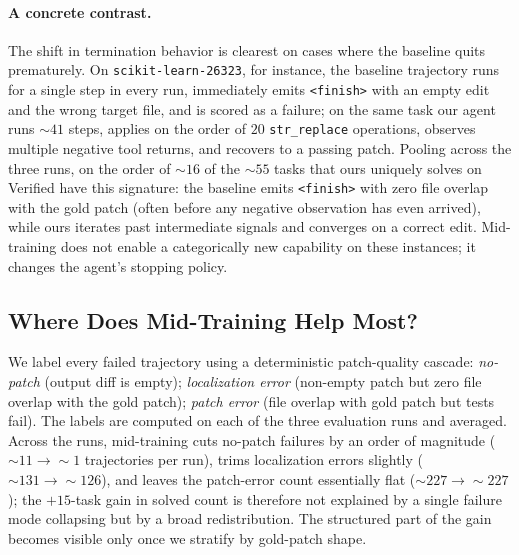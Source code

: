 \paragraph{A concrete contrast.}
The shift in termination behavior is clearest on cases where the baseline
quits prematurely. On \texttt{scikit-learn-26323}, for instance, the baseline
trajectory runs for a single step in every run, immediately emits
\texttt{<finish>} with an empty edit and the wrong target file, and is
scored as a failure; on the same task our agent runs $\sim\!41$ steps,
applies on the order of $20$ \texttt{str\_replace} operations, observes
multiple negative tool returns, and recovers to a passing patch. Pooling
across the three runs, on the order of $\sim\!16$ of the $\sim\!55$ tasks
that ours uniquely solves on Verified have this signature: the baseline
emits \texttt{<finish>} with zero file overlap with the gold patch (often
before any negative observation has even arrived), while ours iterates past
intermediate signals and converges on a correct edit. Mid-training does not
enable a categorically new capability on these instances; it changes the
agent's stopping policy.


\subsection{Where Does Mid-Training Help Most?}
\label{sec:analysis:failure}

We label every failed trajectory using a deterministic patch-quality
cascade: \emph{no-patch} (output diff is empty); \emph{localization error}
(non-empty patch but zero file overlap with the gold patch); \emph{patch
error} (file overlap with gold patch but tests fail). The labels are
computed on each of the three evaluation runs and averaged. Across the
runs, mid-training cuts no-patch failures by an order of magnitude
($\sim\!11 \to \sim\!1$ trajectories per run), trims localization errors
slightly ($\sim\!131 \to \sim\!126$), and leaves the patch-error count
essentially flat ($\sim\!227 \to \sim\!227$); the $+15$-task gain in solved
count is therefore not explained by a single failure mode collapsing but
by a broad redistribution. The structured part of the gain becomes visible
only once we stratify by gold-patch shape.


